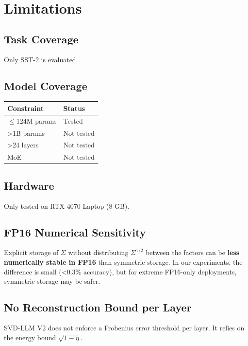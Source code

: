 
\section{Limitations}

\subsection{Task Coverage}

Only SST-2 is evaluated.

\subsection{Model Coverage}

\begin{table}[H]
\centering
\small
\begin{tabular}{ll}
\toprule
\textbf{Constraint} & \textbf{Status} \\
\midrule
$\le$124M params & Tested \\
\textgreater{}1B params & Not tested \\
\textgreater{}24 layers & Not tested \\
MoE & Not tested \\
\bottomrule
\end{tabular}
\end{table}

\subsection{Hardware}

Only tested on RTX 4070 Laptop (8 GB).

\subsection{FP16 Numerical Sensitivity}

Explicit storage of $\Sigma$ without distributing $\Sigma^{1/2}$ between 
the factors can be \textbf{less numerically stable in FP16} than symmetric 
storage. In our experiments, the difference is small (\textless{}0.3\% accuracy), 
but for extreme FP16-only deployments, symmetric storage may be safer.

\subsection{No Reconstruction Bound per Layer}

SVD-LLM V2 does not enforce a Frobenius error threshold per layer. It relies 
on the energy bound $\sqrt{1 - \eta}$.

